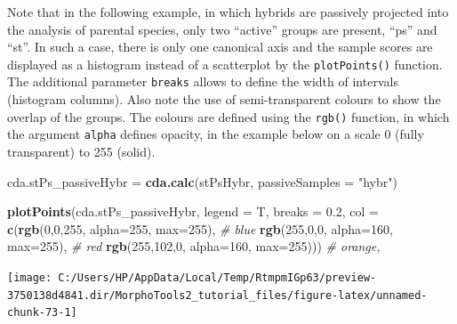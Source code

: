 \documentclass[
]{article}
\newenvironment{Shaded}{\begin{snugshade}}{\end{snugshade}}
\newcommand{\CommentTok}[1]{\textcolor[rgb]{0.56,0.35,0.01}{\textit{#1}}}
\newcommand{\DataTypeTok}[1]{\textcolor[rgb]{0.13,0.29,0.53}{#1}}
\newcommand{\DecValTok}[1]{\textcolor[rgb]{0.00,0.00,0.81}{#1}}
\newcommand{\FloatTok}[1]{\textcolor[rgb]{0.00,0.00,0.81}{#1}}
\newcommand{\KeywordTok}[1]{\textcolor[rgb]{0.13,0.29,0.53}{\textbf{#1}}}
\newcommand{\NormalTok}[1]{#1}
\newcommand{\StringTok}[1]{\textcolor[rgb]{0.31,0.60,0.02}{#1}}
\begin{document}
Note that in the following example, in which hybrids are passively
projected into the analysis of parental species, only two ``active''
groups are present, ``ps'' and ``st''. In such a case, there is only one
canonical axis and the sample scores are displayed as a histogram
instead of a scatterplot by the \texttt{plotPoints()} function. The
additional parameter \texttt{breaks} allows to define the width of
intervals (histogram columns). Also note the use of semi-transparent
colours to show the overlap of the groups. The colours are defined using
the \texttt{rgb()} function, in which the argument \texttt{alpha}
defines opacity, in the example below on a scale 0 (fully transparent)
to 255 (solid).

\begin{Shaded}
\begin{Highlighting}[]

\NormalTok{cda.stPs_passiveHybr =}\StringTok{ }\KeywordTok{cda.calc}\NormalTok{(stPsHybr, }\DataTypeTok{passiveSamples =} \StringTok{"hybr"}\NormalTok{)}

\KeywordTok{plotPoints}\NormalTok{(cda.stPs_passiveHybr, }\DataTypeTok{legend =}\NormalTok{ T, }\DataTypeTok{breaks =} \FloatTok{0.2}\NormalTok{,}
                \DataTypeTok{col =} \KeywordTok{c}\NormalTok{(}\KeywordTok{rgb}\NormalTok{(}\DecValTok{0}\NormalTok{,}\DecValTok{0}\NormalTok{,}\DecValTok{255}\NormalTok{, }\DataTypeTok{alpha=}\DecValTok{255}\NormalTok{, }\DataTypeTok{max=}\DecValTok{255}\NormalTok{), }\CommentTok{# blue}
                        \KeywordTok{rgb}\NormalTok{(}\DecValTok{255}\NormalTok{,}\DecValTok{0}\NormalTok{,}\DecValTok{0}\NormalTok{, }\DataTypeTok{alpha=}\DecValTok{160}\NormalTok{, }\DataTypeTok{max=}\DecValTok{255}\NormalTok{), }\CommentTok{# red}
                        \KeywordTok{rgb}\NormalTok{(}\DecValTok{255}\NormalTok{,}\DecValTok{102}\NormalTok{,}\DecValTok{0}\NormalTok{, }\DataTypeTok{alpha=}\DecValTok{160}\NormalTok{, }\DataTypeTok{max=}\DecValTok{255}\NormalTok{))) }\CommentTok{# orange, }
\end{Highlighting}
\end{Shaded}

\begin{center}\texttt{[image: C:/Users/HP/AppData/Local/Temp/RtmpmIGp63/preview-3750138d4841.dir/MorphoTools2\_tutorial\_files/figure-latex/unnamed-chunk-73-1]} \end{center}
\end{document}
